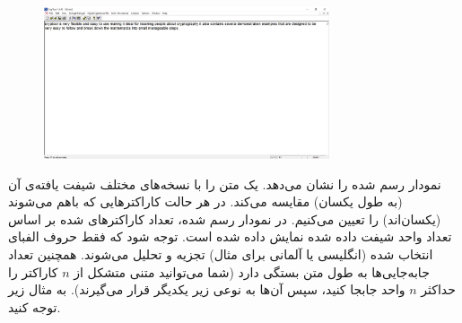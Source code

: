 \documentclass{article}
\begin{document}
\begin{figure}[H]
    \centering
    \includegraphics[width=0.75\textwidth]{figures/4e.jpg}
    \caption
	{}
    \label{fig:fig1}
\end{figure}
نمودار رسم شده  را نشان می‌دهد.   یک متن را با نسخه‌های مختلف شیفت یافته‌ی آن (به طول یکسان) مقایسه می‌کند. در هر حالت کاراکترهایی که باهم  می‌شوند (یکسان‌اند) را تعیین می‌کنیم. در نمودار رسم شده، تعداد کاراکترهای شده بر اساس تعداد واحد شیفت داده شده نمایش داده شده است. توجه شود که فقط حروف الفبای انتخاب شده (انگلیسی یا آلمانی برای مثال) تجزیه و تحلیل می‌شوند. همچنین تعداد جابه‌جایی‌ها به طول متن بستگی دارد (شما می‌توانید متنی متشکل از $n$ کاراکتر را حداکثر $n$ واحد جابجا کنید، سپس آن‌ها به نوعی زیر یکدیگر قرار می‌گیرند). به مثال زیر توجه کنید.
\end{document}
